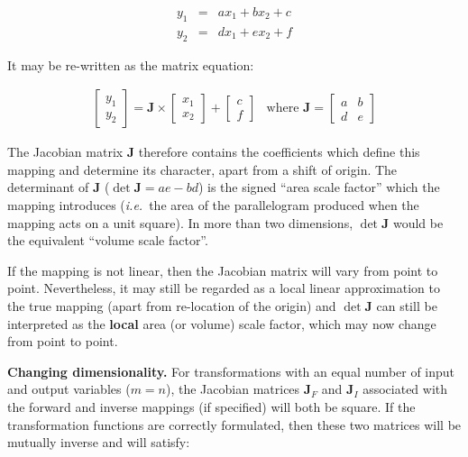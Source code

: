 \documentclass[twoside,nolof,11pt]{starlink}
\begin{document}
\begin{equation}
\begin{array}{lll}
y_1 & = & a x_1 + b x_2 + c \\
y_2 & = & d x_1 + e x_2 + f
\end{array}
\end{equation}

It may be re-written as the matrix equation:

\begin{equation}
\begin{array}{cc}
\left[ \begin{array}{c} y_1 \\ y_2 \end{array} \right]
= \mathbf{J} \times \left[ \begin{array}{c} x_1 \\ x_2 \end{array} \right]
+ \left[ \begin{array}{c} c \\ f \end{array} \right]
&
\mbox{where }
\mathbf{J} = \left[ \begin{array}{cc} a & b \\ d & e \end{array} \right]
\end{array}
\end{equation}

The Jacobian matrix $\mathbf{J}$ therefore contains the coefficients which
define this mapping and determine its character, apart from a shift of
origin.
The determinant of $\mathbf{J}$ (\mbox{\small$\det\mathbf{J}=ae-bd$})
is the signed ``area scale factor'' which the mapping introduces (\emph{i.e.}\
the area of the parallelogram produced when the mapping acts on a unit
square).
In more than two dimensions, $\det\mathbf{J}$ would be the equivalent ``volume
scale factor''.

If the mapping is not linear, then the Jacobian matrix will vary from point to
point.
Nevertheless, it may still be regarded as a local linear approximation to
the true mapping (apart from re-location of the origin) and \mbox{$\det
\mathbf{J}$} can still be interpreted as the \textbf{local} area (or volume) scale
factor, which may now change from point to point.

\textbf{Changing dimensionality.}
For transformations with an equal number of input and output variables
(\mbox{$m=n$}), the Jacobian matrices $\mathbf{J}_F$ and $\mathbf{J}_I$
associated
with the forward and inverse mappings (if specified) will both be square.
If the transformation functions are correctly formulated, then these two
matrices will be mutually inverse and will satisfy:
\end{document}
